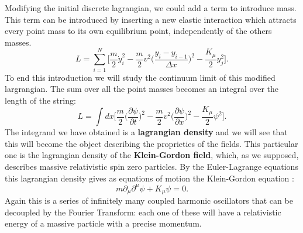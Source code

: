 Modifying the initial discrete lagrangian, we could add a term to introduce mass. This term can be introduced by inserting a new elastic interaction which attracts every point mass to its own equilibrium point, independently of the others masses.
\begin{equation*}
    L=\sum_{i=1}^{N}\bigg[\frac{m}{2}\dot y_i^2-\frac{m}{2}v^2\bigg(\frac{y_i-y_{i-1}}{\Delta x}\bigg)^2-\frac{K_\mu}{2} y_j^2\bigg].
\end{equation*}
To end this introduction we will study the continuum limit of this modified largrangian. The sum over all the point masses becomes an integral over the length of the string:
\begin{equation*}
    L=\int dx\bigg[\frac{m}{2}\bigg(\frac{\partial\psi}{\partial t}\bigg)^2-\frac{m}{2}v^2\bigg(\frac{\partial\psi}{\partial x}\bigg)^2-\frac{K_\mu}{2}\psi^2\bigg].
\end{equation*} 
The integrand we have obtained is a \textbf{lagrangian density} and we will see that this will become the object describing the proprieties of the fields. This particular one is the lagrangian density of the \textbf{Klein-Gordon field}, which, as we supposed, describes massive relativistic spin zero particles. By the Euler-Lagrange equations this lagrangian density gives as equations of motion the Klein-Gordon equation :
\begin{equation*}
    m\partial_\mu\partial^\mu\psi+K_\mu\psi=0.
\end{equation*}
Again this is a series of infinitely many coupled harmonic oscillators that can be decoupled by the Fourier Transform: each one of these will have a relativistic energy of a massive particle with a precise momentum.

